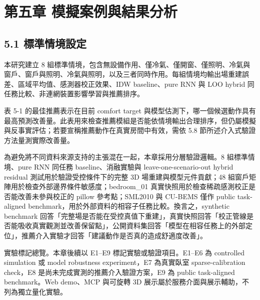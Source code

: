 \documentclass[12pt,a4paper]{article}
\begin{document}
\clearpage

\section*{第五章 模擬案例與結果分析}

\subsection*{5.1 標準情境設定}

本研究建立 8 組標準情境，包含無設備作用、僅冷氣、僅開窗、僅照明、冷氣與窗戶、窗戶與照明、冷氣與照明，以及三者同時作用。每組情境均輸出場重建誤差、區域平均值、感測器校正效果、IDW baseline、pure RNN 與 LOO hybrid 同任務比較、非連網裝置影響學習與推薦排序。


表 5-1 的最佳推薦表示在目前 comfort target 與模型估測下，哪一個候選動作具有最高預測改善量。此表用來檢查推薦模組是否能依情境輸出合理排序，但仍屬模擬與反事實評估；若要宣稱推薦動作在真實房間中有效，需依 5.8 節所述介入式驗證方法量測實際改善量。


為避免將不同資料來源支持的主張混在一起，本章採用分層驗證邏輯。8 組標準情境、pure RNN 同任務 baseline、消融實驗與 leave-one-scenario-out hybrid residual 測試用於驗證受控條件下的完整 3D 場重建與模型元件貢獻；48 組窗戶矩陣用於檢查外部邊界條件敏感度；bedroom\_\allowbreak{}01 真實快照用於檢查稀疏感測校正是否能改善未參與校正的 pillow 參考點；SML2010 與 CU-BEMS 僅作 public task-aligned benchmark，用於外部資料的相容子任務比較。換言之，synthetic benchmark 回答「完整場是否能在受控真值下重建」，真實快照回答「校正管線是否能吸收真實觀測並改善保留點」，公開資料集回答「模型在相容任務上的外部定位」，推薦介入實驗才回答「建議動作是否真的造成舒適度改善」。


實驗標記總覽。本章後續以 E1--E9 標記實驗或驗證項目。E1--E6 為 controlled simulation 或 model robustness experiment，E7 為真實臥室 sparse-calibration check，E8 是尚未完成實測的推薦介入驗證方案，E9 為 public task-aligned benchmark。Web demo、MCP 與可旋轉 3D 展示屬於服務介面與展示輔助，不列為獨立量化實驗。
\end{document}

